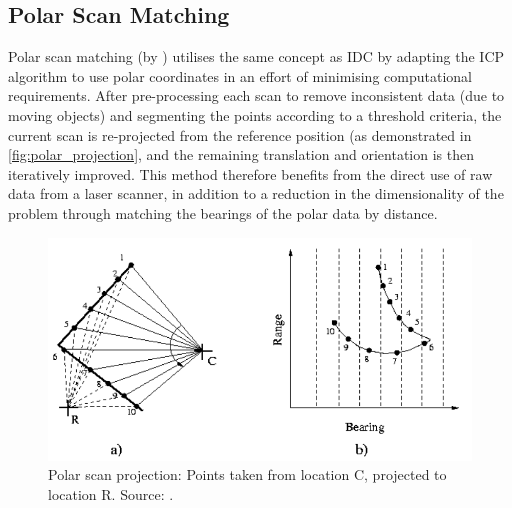 \documentclass[authoryearcitations]{UoYCSproject}
\begin{document}
\subsection{Polar Scan Matching}
\label{subsec:psm}
Polar scan matching (by \citet{Diosi2005-nv}) utilises the same concept as IDC by adapting the ICP algorithm to use polar coordinates in an effort of minimising computational requirements. After pre-processing each scan to remove inconsistent data (due to moving objects) and segmenting the points according to a threshold criteria, the current scan is re-projected from the reference position (as demonstrated in \autoref{fig:polar_projection}, and the remaining translation and orientation is then iteratively improved. This method therefore benefits from the direct use of raw data from a laser scanner, in addition to a reduction in the dimensionality of the problem through matching the bearings of the polar data by distance. 

\begin{figure}[t]
	\centering
	\includegraphics[width=\textwidth,keepaspectratio]{images/polar_projection.png}
	\caption[Polar Scan projection]{Polar scan projection: Points taken from location C, projected to location R. Source: \citet{Diosi2005-nv}.}
	\label{fig:polar_projection}
\end{figure}
\end{document}
